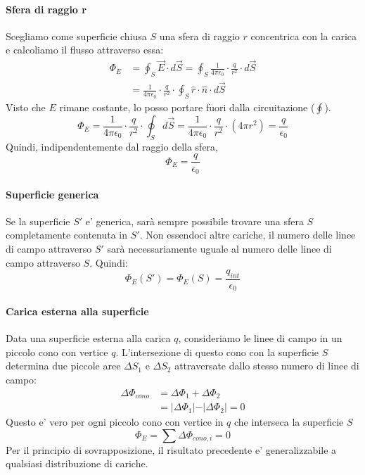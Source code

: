 \documentclass[a4paper, 10pt]{article}
\begin{document}
			\paragraph*{Sfera di raggio r} Scegliamo come superficie chiusa $S$ una sfera di raggio $r$ concentrica con la carica 
		 	e calcoliamo il flusso attraverso essa:
			\begin{equation*}
				\begin{split}
					\Phi_E &= \oint_S \overrightarrow{E} \cdot d\overrightarrow{S} = \oint_S \frac{1}{4 \pi \epsilon_0} 
					\cdot \frac{q}{r^2} \cdot d \overrightarrow{S} \\
					&= \frac{1}{4 \pi \epsilon_0} \cdot \frac{q}{r^2} \cdot \oint_S \widehat{r} \cdot \widehat{n} \cdot d
					\overrightarrow{S}
				\end{split}
			\end{equation*}
			Visto che $E$ rimane costante, lo posso portare fuori dalla circuitazione ($\oint$). 
			\begin{equation*}
					\Phi_E = \frac{1}{4 \pi \epsilon_0} \cdot \frac{q}{r^2} \cdot \oint_S d\overrightarrow{S} = 
					\frac{1}{4 \pi \epsilon_0} \cdot \frac{q}{r^2} \cdot (4 \pi r^2) = \frac{q}{\epsilon_0}
			\end{equation*}
			Quindi, indipendentemente dal raggio della sfera,
			\[ \Phi_E = \frac{q}{\epsilon_0} \]
			\paragraph*{Superficie generica}
			Se la superficie $S'$ e' generica, sarà sempre possibile trovare una sfera $S$ completamente contenuta in $S'$. 
			Non essendoci altre cariche, il numero delle linee di campo attraverso $S'$ sarà necessariamente uguale al numero delle
			linee di campo attraverso $S$. Quindi: \[ \Phi_E(S') = \Phi_E(S) = \frac{q_{int}}{\epsilon_0} \]
			\paragraph*{Carica esterna alla superficie} Data una superficie esterna alla carica $q$, consideriamo le linee di campo 
			in un piccolo cono con vertice $q$. L'intersezione di questo cono con la superficie $S$ determina due piccole aree 
			$\Delta S_1$ e $\Delta S_2$ attraversate dallo stesso numero di linee di campo:
			\begin{equation*}
			\begin{split}
				\Delta \Phi_{cono} &= \Delta \Phi_1 + \Delta \Phi_2 \\
				&= \vert \Delta \Phi_1 \vert - \vert \Delta \Phi_2 \vert = 0
			\end{split}
			\end{equation*}
			Questo e' vero per ogni piccolo cono con vertice in $q$ che interseca la superficie $S$
			\[ \Phi_E = \sum \Delta \Phi_{cono, i} = 0 \]
			Per il principio di sovrapposizione, il risultato precedente e' generalizzabile a qualsiasi distribuzione di cariche.
\end{document}
